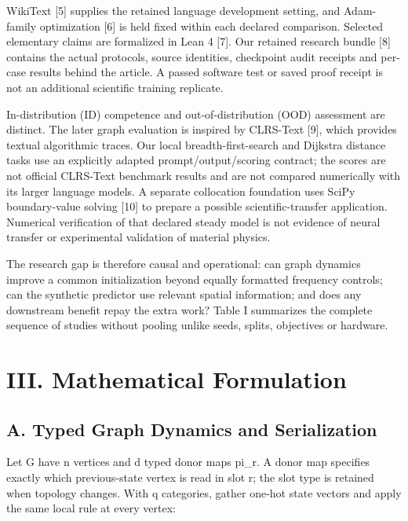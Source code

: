 \documentclass[10pt,letterpaper,twocolumn]{article}
\begin{document}
WikiText [5] supplies the retained language development setting, and Adam-family optimization [6] is held fixed within each declared comparison. Selected elementary claims are formalized in Lean 4 [7]. Our retained research bundle [8] contains the actual protocols, source identities, checkpoint audit receipts and per-case results behind the article. A passed software test or saved proof receipt is not an additional scientific training replicate.

In-distribution (ID) competence and out-of-distribution (OOD) assessment are distinct. The later graph evaluation is inspired by CLRS-Text [9], which provides textual algorithmic traces. Our local breadth-first-search and Dijkstra distance tasks use an explicitly adapted prompt/\allowbreak{}output/\allowbreak{}scoring contract; the scores are not official CLRS-Text benchmark results and are not compared numerically with its larger language models. A separate collocation foundation uses SciPy boundary-value solving [10] to prepare a possible scientific-transfer application. Numerical verification of that declared steady model is not evidence of neural transfer or experimental validation of material physics.

The research gap is therefore causal and operational: can graph dynamics improve a common initialization beyond equally formatted frequency controls; can the synthetic predictor use relevant spatial information; and does any downstream benefit repay the extra work? Table I summarizes the complete sequence of studies without pooling unlike seeds, splits, objectives or hardware.

\section*{III. Mathematical Formulation}
\subsection*{A. Typed Graph Dynamics and Serialization}
Let G have n vertices and d typed donor maps pi\_\allowbreak{}r. A donor map specifies exactly which previous-state vertex is read in slot r; the slot type is retained when topology changes. With q categories, gather one-hot state vectors and apply the same local rule at every vertex:
\end{document}
